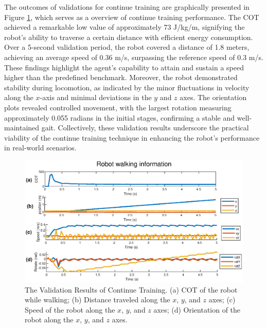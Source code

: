 The outcomes of validations for continue training are graphically presented in Figure \ref{fig:CT}, which serves as a overview of continue training performance. The COT achieved a remarkable low value of approximately 73 J/kg/m, signifying the robot's ability to traverse a certain distance with efficient energy consumption. Over a 5-second validation period, the robot covered a distance of 1.8 meters, achieving an average speed of 0.36 m/s, surpassing the reference speed of 0.3 m/s. These findings highlight the agent's capability to attain and sustain a speed higher than the predefined benchmark. Moreover, the robot demonstrated stability during locomotion, as indicated by the minor fluctuations in velocity along the $x$-axis and minimal deviations in the $y$ and $z$ axes. The orientation plots revealed controlled movement, with the largest rotation measuring approximately 0.055 radians in the initial stages, confirming a stable and well-maintained gait. Collectively, these validation results underscore the practical viability of the continue training technique in enhancing the robot's performance in real-world scenarios.

\begin{figure}[htb]
    \centering
    \includegraphics[width=0.9\linewidth]{img/chap5/best_CL.eps}
    \caption{The Validation Results of Continue Training. (a) COT of the robot while walking; (b) Distance traveled along the $x$, $y$, and $z$ axes; (c) Speed of the robot along the $x$, $y$, and $z$ axes; (d) Orientation of the robot along the $x$, $y$, and $z$ axes.}
    \label{fig:CT}
\end{figure}

